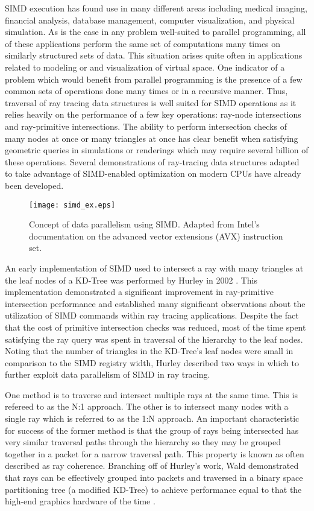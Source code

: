 SIMD execution has found use in many different areas including medical imaging,
financial analysis, database management, computer visualization, and physical
simulation. As is the case in any problem well-suited to parallel programming,
all of these applications perform the same set of computations many times on
similarly structured sets of data. This situation arises quite often in
applications related to modeling or and visualization of virtual space. One
indicator of a problem which would benefit from parallel programming is the
presence of a few common sets of operations done many times or in a recursive
manner. Thus, traversal of ray tracing data structures is well suited for SIMD
operations as it relies heavily on the performance of a few key operations:
ray-node intersections and ray-primitive intersections. The ability to perform
intersection checks of many nodes at once or many triangles at once has clear
benefit when satisfying geometric queries in simulations or renderings which may
require several billion of these operations. Several demonstrations of ray-tracing data
structures adapted to take advantage of SIMD-enabled optimization on modern CPUs
have already been developed.

\begin{figure}
  \centering
  \texttt{[image: simd\_ex.eps]}
  \caption[Graphic representation of SIMD operations in CPUs.]{Concept of data parallelism using SIMD. Adapted from Intel's
    documentation on the advanced vector extensions (AVX) instruction
    set. \cite{Intel_AVX}}
  \label{fig:simd}
\end{figure}

An early implementation of SIMD used to intersect a ray with many triangles at
the leaf nodes of a KD-Tree was performed by Hurley in 2002
\cite{Hurley_2002}. This implementation demonstrated a significant improvement in
ray-primitive intersection performance and established many significant
observations about the utilization of SIMD commands within ray tracing
applications. Despite the fact that the cost of primitive intersection checks
was reduced, most of the time spent satisfying the ray query was spent in
traversal of the hierarchy to the leaf nodes. Noting that the number of
triangles in the KD-Tree's leaf nodes were small in comparison to the SIMD
registry width, Hurley described two ways in which to further exploit data
parallelism of SIMD in ray tracing.

One method is to traverse and intersect multiple rays at the same time. This is
refereed to as the N:1 approach. The other is to intersect many nodes with a
single ray which is referred to as the 1:N approach. An important characteristic
for success of the former method is that the group of rays being intersected has
very similar traversal paths through the hierarchy so they may be grouped
together in a packet for a narrow traversal path. This property is known as
often described as ray coherence. Branching off of Hurley's work, Wald
demonstrated that rays can be effectively grouped into packets and traversed in
a binary space partitioning tree (a modified KD-Tree) to achieve performance
equal to that the high-end graphics hardware of the time \cite{Wald_2001}.

